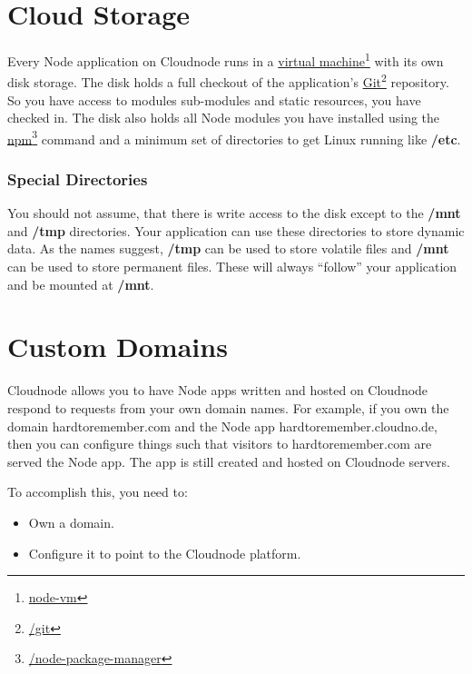 \chapter{Cloud Storage}
\label{cloudstorage}

Every Node application on Cloudnode runs in a \href{node-vm}{virtual machine}\footnote{\href{node-vm}{node-vm}} with its own disk storage. The disk holds a full checkout of the application's \href{/git}{Git}\footnote{\href{/git}{\slash git}} repository. So you have access to modules sub-modules and static resources, you have checked in. The disk also holds all Node modules you have installed using the \href{/node-package-manager}{npm}\footnote{\href{/node-package-manager}{\slash node-package-manager}} command and a minimum set of directories to get Linux running like \textbf{\slash etc}.

\subsection{Special Directories}
\label{specialdirectories}

You should not assume, that there is write access to the disk except to the \textbf{\slash mnt} and \textbf{\slash tmp} directories. Your application can use these directories to store dynamic data. As the names suggest, \textbf{\slash tmp} can be used to store volatile files and \textbf{\slash mnt} can be used to store permanent files. These will always ``follow'' your application and be mounted at \textbf{\slash mnt}.

\chapter{Custom Domains}
\label{customdomains}

Cloudnode allows you to have Node apps written and hosted on Cloudnode respond to requests from your own domain names. For example, if you own the domain hardtoremember.com and the Node app hardtoremember.cloudno.de, then you can configure things such that visitors to hardtoremember.com are served the Node app. The app is still created and hosted on Cloudnode servers.

To accomplish this, you need to:

\begin{itemize}
\item Own a domain.

\item Configure it to point to the Cloudnode platform.

\end{itemize}


